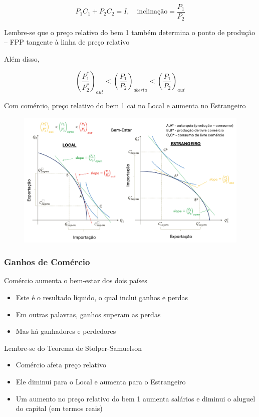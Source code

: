 \documentclass[a4paper,12pt]{article}[abntex2]
\begin{document}
\[
P_1 C_1 + P_2 C_2 = I, \quad \text{inclinação} = \frac{P_1}{P_2}
\]

Lembre-se que o preço relativo do bem 1 também determina o ponto de produção – FPP tangente à linha de preço relativo

Além disso,

\[
\left( \frac{P_1^*}{P_2^*} \right)_{aut} < \left( \frac{P_1}{P_2} \right)_{aberta} < \left( \frac{P_1}{P_2} \right)_{aut}
\]

Com comércio, preço relativo do bem 1 cai no Local e aumenta no Estrangeiro

\begin{figure}[H]
    \centering
    \includegraphics[width=0.7\linewidth]{Imagens/a12i12.png}
\end{figure}

\subsubsection{\textbf{Ganhos de Comércio}}
Comércio aumenta o bem-estar dos dois países
\begin{itemize}
    \item Este é o resultado líquido, o qual inclui ganhos e perdas
    \item Em outras palavras, ganhos superam as perdas
    \item Mas há ganhadores e perdedores
\end{itemize}

Lembre-se do Teorema de Stolper-Samuelson
\begin{itemize}
    \item Comércio afeta preço relativo
    \item Ele diminui para o Local e aumenta para o Estrangeiro
    \item Um aumento no preço relativo do bem 1 aumenta salários e diminui o aluguel do capital (em termos reais)
\end{itemize}
\end{document}
